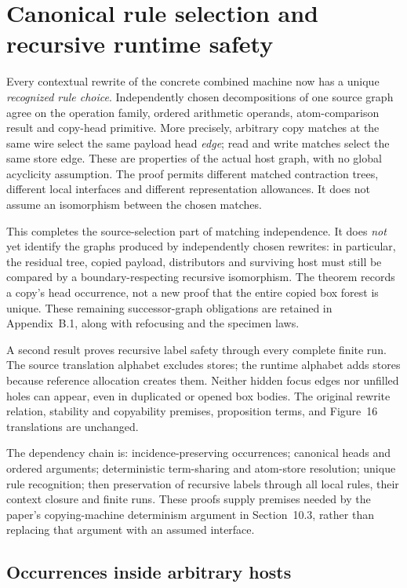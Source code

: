 \clearpage
\section{Canonical rule selection and recursive runtime safety}
\label{sec:copying-selection}
Every contextual rewrite of the concrete combined machine now has a unique
\emph{recognized rule choice}. Independently chosen decompositions of one
source graph agree on the operation family, ordered arithmetic operands,
atom-comparison result and copy-head primitive. More precisely, arbitrary
copy matches at the same wire select the same payload head \emph{edge}; read
and write matches select the same store edge. These are properties of the
actual host graph, with no global acyclicity assumption. The proof permits
different matched contraction trees, different local interfaces and different
representation allowances. It does not assume an isomorphism between the
chosen matches.

This completes the source-selection part of matching independence. It does
\emph{not} yet identify the graphs produced by independently chosen rewrites:
in particular, the residual tree, copied payload, distributors and surviving
host must still be compared by a boundary-respecting recursive isomorphism.
The theorem records a copy's head occurrence, not a new proof that the entire
copied box forest is unique. These remaining successor-graph obligations are
retained in Appendix~B.1, along with refocusing and the specimen laws.

A second result proves recursive label safety through every complete finite
run. The source translation alphabet excludes stores; the runtime alphabet
adds stores because reference allocation creates them. Neither hidden focus
edges nor unfilled holes can appear, even in duplicated or opened box bodies.
The original rewrite relation, stability and copyability premises, proposition
terms, and Figure~16 translations are unchanged.

The dependency chain is: incidence-preserving occurrences; canonical heads
and ordered arguments; deterministic term-sharing and atom-store resolution;
unique rule recognition; then preservation of recursive labels through all
local rules, their context closure and finite runs. These proofs supply
premises needed by the paper's copying-machine determinism argument in
Section~10.3, rather than replacing that argument with an assumed interface.

\subsection{Occurrences inside arbitrary hosts}

